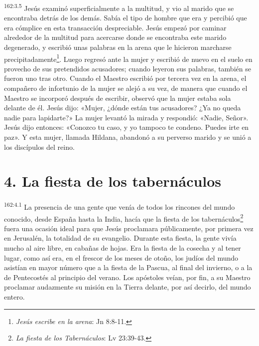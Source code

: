 \par 
\textsuperscript{162:3.5} Jesús examinó superficialmente a la multitud, y vio al marido que se encontraba detrás de los demás. Sabía el tipo de hombre que era y percibió que era cómplice en esta transacción despreciable. Jesús empezó por caminar alrededor de la multitud para acercarse donde se encontraba este marido degenerado, y escribió unas palabras en la arena que le hicieron marcharse precipitadamente\footnote{\textit{Jesús escribe en la arena}: Jn 8:8-11.}. Luego regresó ante la mujer y escribió de nuevo en el suelo en provecho de sus pretendidos acusadores; cuando leyeron sus palabras, también se fueron uno tras otro. Cuando el Maestro escribió por tercera vez en la arena, el compañero de infortunio de la mujer se alejó a su vez, de manera que cuando el Maestro se incorporó después de escribir, observó que la mujer estaba sola delante de él. Jesús dijo: «Mujer, ¿dónde están tus acusadores? ¿Ya no queda nadie para lapidarte?» La mujer levantó la mirada y respondió: «Nadie, Señor». Jesús dijo entonces: «Conozco tu caso, y yo tampoco te condeno. Puedes irte en paz». Y esta mujer, llamada Hildana, abandonó a su perverso marido y se unió a los discípulos del reino.

\section*{4. La fiesta de los tabernáculos}
\par 
\textsuperscript{162:4.1} La presencia de una gente que venía de todos los rincones del mundo conocido, desde España hasta la India, hacía que la fiesta de los tabernáculos\footnote{\textit{La fiesta de los Tabernáculos}: Lv 23:39-43.} fuera una ocasión ideal para que Jesús proclamara públicamente, por primera vez en Jerusalén, la totalidad de su evangelio. Durante esta fiesta, la gente vivía mucho al aire libre, en cabañas de hojas. Era la fiesta de la cosecha y al tener lugar, como así era, en el frescor de los meses de otoño, los judíos del mundo asistían en mayor número que a la fiesta de la Pascua, al final del invierno, o a la de Pentecostés al principio del verano. Los apóstoles veían, por fin, a su Maestro proclamar audazmente su misión en la Tierra delante, por así decirlo, del mundo entero.

